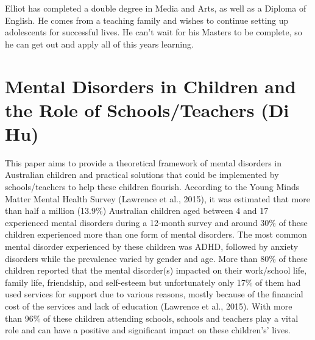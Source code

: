 \documentclass[twoside,12pt,a4paper,notitlepage]{memoir}
\begin{document}
Elliot has completed a double degree in Media and Arts, as well as a Diploma of English. He comes from a teaching family and wishes to continue setting up adolescents for successful lives. He can’t wait for his Masters to be complete, so he can get out and apply all of this years learning.



\pagebreak
\section*{Mental Disorders in Children and the Role of Schools/Teachers (Di Hu)}
\label{aut:hu}

This paper aims to provide a theoretical framework of mental disorders in Australian children and practical solutions that could be implemented by schools/teachers to help these children flourish. According to the Young Minds Matter Mental Health Survey (Lawrence et al., 2015), it was estimated that more than half a million (13.9\%) Australian children aged between 4 and 17 experienced mental disorders during a 12-month survey and around 30\% of these children experienced more than one form of mental disorders. The most common mental disorder experienced by these children was ADHD, followed by anxiety disorders while the prevalence varied by gender and age. More than 80\% of these children reported that the mental disorder(s) impacted on their work/school life, family life, friendship, and self-esteem but unfortunately only 17\% of them had used services for support due to various reasons, mostly because of the financial cost of the services and lack of education (Lawrence et al., 2015). With more than 96\% of these children attending schools, schools and teachers play a vital role and can have a positive and significant impact on these children’s’ lives.
\end{document}
